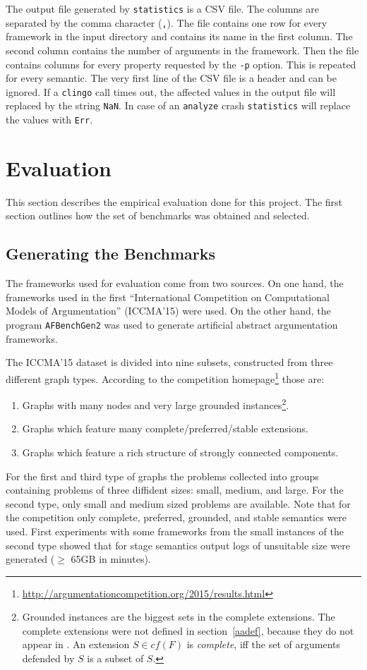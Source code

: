 \documentclass[parskip=half]{scrartcl}
\begin{document}
The output file generated by \texttt{statistics} is a CSV file. The columns are
separated by the comma character (\texttt{,}). The file contains one row for
every framework in the input directory and contains its name in the first
column. The second column contains the number of arguments in the framework.
Then the file contains columns for every property requested by the \texttt{-p}
option. This is repeated for every semantic. The very first
line of the CSV file is a header and can be ignored. If a \texttt{clingo} call
times out, the affected values in the output file will replaced by the string
\texttt{NaN}. In case of an \texttt{analyze} crash \texttt{statistics} will
replace the values with \texttt{Err}.

\section{Evaluation}
\label{evaluation}
This section describes the empirical evaluation done for this project.
The first section outlines how the set of benchmarks was obtained and selected.

\subsection{Generating the Benchmarks}
\label{gen_bench}
The frameworks used for evaluation come from two sources. On one hand,
the frameworks used in the first ``International Competition on Computational
Models of Argumentation'' (ICCMA'15) were used. On the other hand,
the program \texttt{AFBenchGen2} was used to generate artificial
abstract argumentation frameworks.

The ICCMA'15 dataset is divided into nine subsets, constructed from
three different graph types. According to the competition
homepage\footnote{\url{http://argumentationcompetition.org/2015/results.html}}
those are:
\begin{enumerate}
  \item Graphs with many nodes and very large grounded instances\footnote{
  Grounded instances are the biggest sets in the complete extensions. The complete
  extensions were not defined in section~\ref{aadef}, because they do not appear
  in \cite{linsbichler2015hidden}. An extension $S\in cf(F)$ is \emph{complete}, iff
  the set of arguments defended by $S$ is a subset of $S$.}.
  \item Graphs which feature many complete/preferred/stable extensions.
  \item Graphs which feature a rich structure of strongly connected components.
\end{enumerate}
For the first and third type of graphs the problems collected into groups
containing problems of three diffident sizes: small, medium, and large. For the
second type, only small and medium sized problems are available. Note that for
the competition only complete, preferred, grounded, and stable semantics were
used. First experiments with some frameworks from the small instances of the
second type showed that for stage semantics output logs of unsuitable size were
generated ($\geq$ 65GB in minutes).
\end{document}

